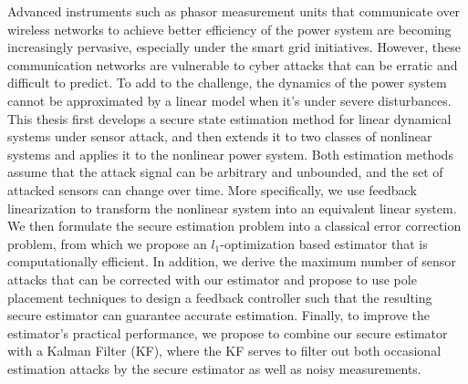 \documentclass[12pt, oneside, final]{lib/ucthesis}
\begin{document}
\begin{frontmatter}

Advanced instruments such as phasor measurement units that communicate over wireless networks to achieve better efficiency of the power system are becoming increasingly pervasive, especially under the smart grid initiatives. 
However, these communication networks are vulnerable to cyber attacks that can be erratic and difficult to predict.
To add to the challenge, the dynamics of the power system cannot be approximated by a linear model when it's under severe disturbances.
This thesis first develops a secure state estimation method for linear dynamical systems under sensor attack, and then extends it to two classes of nonlinear systems and applies it to the nonlinear power system.
Both estimation methods assume that the attack signal can be arbitrary and unbounded, and the set of attacked sensors can change over time.
More specifically, we use feedback linearization to transform the nonlinear system into an equivalent linear system.
We then formulate the secure estimation problem into a classical error correction problem, from which we propose an $l_1$-optimization based estimator that is computationally efficient.
In addition, we derive the maximum number of sensor attacks that can be corrected with our estimator and propose to use pole placement techniques to design a feedback controller such that the resulting secure estimator can guarantee accurate estimation. 
Finally, to improve the estimator's practical performance, we propose to combine our secure estimator with a Kalman Filter (KF), where the KF serves to  filter out both occasional estimation attacks by the secure estimator as well as noisy measurements.

\abstractsignature
\endabstract

\end{frontmatter}
\end{document}
